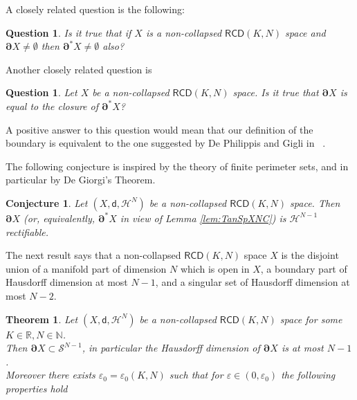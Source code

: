 \documentclass[a4paper]{amsart}
\theoremstyle{plain}
\newtheorem{theorem}[lemma]{Theorem}
\newtheorem{conjecture}[lemma]{Conjecture}
\newtheorem{question}[lemma]{Question}
\theoremstyle{definition}
\numberwithin{equation}{section}
\newcommand{\R}{\mathbb{R}}
\newcommand{\N}{\mathbb{N}}
\renewcommand{\S}{\mathcal{S}}
\newcommand{\RCD}{\mathsf{RCD}}
\newcommand{\sfd}{\mathsf d}
\newcommand{\cH}{\mathcal{H}}
\newcommand{\eps}{\varepsilon}
\newcommand{\bRCD}{\boldsymbol\partial}
\begin{document}
{ A closely related question is the following:
\begin{question}\label{bry-reduced-bry}
Is it true that if $X$ is a non-collapsed $\RCD(K,N)$ space and $\bRCD X\ne\emptyset$ then $\bRCD^* X\ne\emptyset$ also?
\end{question}

Another closely related question is

\begin{question}\label{bry-closure-reduced-bry}
Let $X$ be a non-collapsed $\RCD(K,N)$ space. Is it true that $\bRCD X$ is equal to the closure of $\bRCD^* X$?
\end{question}
A positive answer to this question would mean that our definition of the boundary is equivalent to the one suggested by De Philippis and Gigli in ~\cite{GDPNonColl}.



The following conjecture is inspired by the theory of finite perimeter sets, and in particular by De Giorgi's Theorem.


\begin{conjecture}
 Let $(X,\sfd,\cH^{N})$ be a non-collapsed $\RCD(K,N)$ space.   Then  $\bRCD X$ (or, equivalently, $\bRCD^{*} X$ in view of Lemma \ref{lem:TanSpXNC}) is $\cH^{N-1}$ rectifiable.
 \end{conjecture}
 
 
 

The next result says that a non-collapsed $\RCD(K,N)$ space  $X$  is the disjoint union of a manifold part of dimension $N$ which is open in $X$, a boundary part of Hausdorff dimension at most $N-1$, and a singular set of Hausdorff dimension at most $N-2$.  


\begin{theorem}\label{thm-structure}
Let $(X,\sfd,\cH^{N})$ be a non-collapsed $\RCD(K,N)$ space for some $K\in \R, N\in \N$.
\\Then $\bRCD X\subset \S^{N-1}$, in particular the Hausdorff dimension of $\bRCD X$ is at most $N-1$.
\\Moreover  there exists $\eps_{0}=\eps_{0}(K,N)$ such that for  $\eps\in (0,\eps_{0})$ 
the following properties hold



\end{theorem}}
\end{document}

